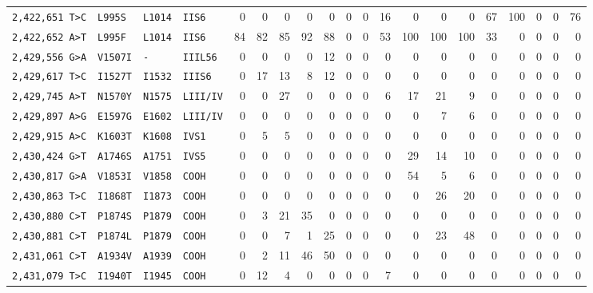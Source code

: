 \begin{tabular}{llllrrrrrrrrrrrrrrrr}
\texttt{2,422,651 T>C} & \texttt{L995S} & \texttt{L1014} & \texttt{IIS6} & 0 & 0 & 0 & 0 & 0 & 0 & 0 & 16 & 0 & 0 & 0 & 67 & 100 & 0 & 0 & 76 \\

\texttt{2,422,652 A>T} & \texttt{L995F} & \texttt{L1014} & \texttt{IIS6} & 84 & 82 & 85 & 92 & 88 & 0 & 0 & 53 & 100 & 100 & 100 & 33 & 0 & 0 & 0 & 0 \\

\texttt{2,429,556 G>A} & \texttt{V1507I} & \texttt{-} & \texttt{IIIL56} & 0 & 0 & 0 & 0 & 12 & 0 & 0 & 0 & 0 & 0 & 0 & 0 & 0 & 0 & 0 & 0 \\

\texttt{2,429,617 T>C} & \texttt{I1527T} & \texttt{I1532} & \texttt{IIIS6} & 0 & 17 & 13 & 8 & 12 & 0 & 0 & 0 & 0 & 0 & 0 & 0 & 0 & 0 & 0 & 0 \\

\texttt{2,429,745 A>T} & \texttt{N1570Y} & \texttt{N1575} & \texttt{LIII/IV} & 0 & 0 & 27 & 0 & 0 & 0 & 0 & 6 & 17 & 21 & 9 & 0 & 0 & 0 & 0 & 0 \\

\texttt{2,429,897 A>G} & \texttt{E1597G} & \texttt{E1602} & \texttt{LIII/IV} & 0 & 0 & 0 & 0 & 0 & 0 & 0 & 0 & 0 & 7 & 6 & 0 & 0 & 0 & 0 & 0 \\

\texttt{2,429,915 A>C} & \texttt{K1603T} & \texttt{K1608} & \texttt{IVS1} & 0 & 5 & 5 & 0 & 0 & 0 & 0 & 0 & 0 & 0 & 0 & 0 & 0 & 0 & 0 & 0 \\

\texttt{2,430,424 G>T} & \texttt{A1746S} & \texttt{A1751} & \texttt{IVS5} & 0 & 0 & 0 & 0 & 0 & 0 & 0 & 0 & 29 & 14 & 10 & 0 & 0 & 0 & 0 & 0 \\

\texttt{2,430,817 G>A} & \texttt{V1853I} & \texttt{V1858} & \texttt{COOH} & 0 & 0 & 0 & 0 & 0 & 0 & 0 & 0 & 54 & 5 & 6 & 0 & 0 & 0 & 0 & 0 \\

\texttt{2,430,863 T>C} & \texttt{I1868T} & \texttt{I1873} & \texttt{COOH} & 0 & 0 & 0 & 0 & 0 & 0 & 0 & 0 & 0 & 26 & 20 & 0 & 0 & 0 & 0 & 0 \\

\texttt{2,430,880 C>T} & \texttt{P1874S} & \texttt{P1879} & \texttt{COOH} & 0 & 3 & 21 & 35 & 0 & 0 & 0 & 0 & 0 & 0 & 0 & 0 & 0 & 0 & 0 & 0 \\

\texttt{2,430,881 C>T} & \texttt{P1874L} & \texttt{P1879} & \texttt{COOH} & 0 & 0 & 7 & 1 & 25 & 0 & 0 & 0 & 0 & 23 & 48 & 0 & 0 & 0 & 0 & 0 \\

\texttt{2,431,061 C>T} & \texttt{A1934V} & \texttt{A1939} & \texttt{COOH} & 0 & 2 & 11 & 46 & 50 & 0 & 0 & 0 & 0 & 0 & 0 & 0 & 0 & 0 & 0 & 0 \\

\texttt{2,431,079 T>C} & \texttt{I1940T} & \texttt{I1945} & \texttt{COOH} & 0 & 12 & 4 & 0 & 0 & 0 & 0 & 7 & 0 & 0 & 0 & 0 & 0 & 0 & 0 & 0 \\

\bottomrule
\end{tabular}

